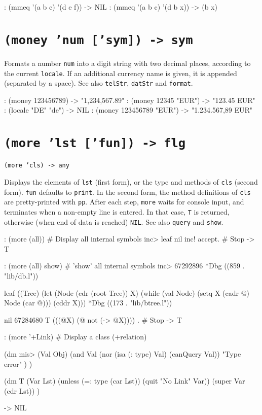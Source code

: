 \begin{wideverbatim}
: (mmeq '(a b c) '(d e f))
-> NIL
: (mmeq '(a b c) '(d b x))
-> (b x)
\end{wideverbatim}

 
\section*{\texttt{(money 'num ['sym]) -> sym}}
\label{sec:func-ref-M-(money 'num ['sym]) -> sym}


Formats a number \texttt{num} into a digit string with two decimal places,
according to the current \texttt{locale}. If an additional currency name is
given, it is appended (separated by a space). See also \texttt{telStr},
\texttt{datStr} and \texttt{format}.


\begin{wideverbatim}
: (money 123456789)
-> "1,234,567.89"
: (money 12345 "EUR")
-> "123.45 EUR"
: (locale "DE" "de")
-> NIL
: (money 123456789 "EUR")
-> "1.234.567,89 EUR"
\end{wideverbatim}

 
\section*{\texttt{(more 'lst ['fun]) -> flg}}
\label{sec:func-ref-M-(more 'lst ['fun]) -> flg}


\texttt{(more 'cls) -> any}

Displays the elements of \texttt{lst} (first form), or the type and methods of
\texttt{cls} (second form). \texttt{fun} defaults to \texttt{print}. In the second form, the
method definitions of \texttt{cls} are pretty-printed with \texttt{pp}. After each
step, \texttt{more} waits for console input, and terminates when a non-empty
line is entered. In that case, \texttt{T} is returned, otherwise (when end of
data is reached) \texttt{NIL}. See also \texttt{query} and \texttt{show}.


\begin{wideverbatim}
: (more (all))                         # Display all internal symbols
inc>
leaf
nil
inc!
accept.                                # Stop
-> T

: (more (all) show)                    # 'show' all internal symbols
inc> 67292896
   *Dbg ((859 . "lib/db.l"))

leaf ((Tree) (let (Node (cdr (root Tree)) X) (while (val Node) (setq X (cadr @) Node (car @))) (cddr X)))
   *Dbg ((173 . "lib/btree.l"))

nil 67284680
   T (((@X) (@ not (-> @X))))
.                                      # Stop
-> T

: (more '+Link)                        # Display a class
(+relation)

(dm mis> (Val Obj)
   (and
      Val
      (nor (isa (: type) Val) (canQuery Val))
      "Type error" ) )

(dm T (Var Lst)
   (unless (=: type (car Lst)) (quit "No Link" Var))
   (super Var (cdr Lst)) )

-> NIL
\end{wideverbatim}

